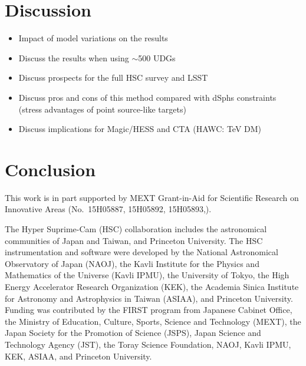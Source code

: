 \documentclass[a4paper,11pt]{article}
\begin{document}
\section{Discussion}
\begin{itemize}
    \item Impact of model variations on the results
    \item Discuss the results when using $\sim$500 UDGs
    \item Discuss prospects for the full HSC survey and LSST
    \item Discuss pros and cons of this method compared with dSphs constraints (stress advantages of point source-like targets)
    \item Discuss implications for Magic/HESS and CTA (HAWC: TeV DM) 
\end{itemize}

\section{Conclusion}

\acknowledgments
This work is in part supported by MEXT Grant-in-Aid for Scientific Research on Innovative Areas (No.~15H05887, 15H05892, 15H05893,).


The Hyper Suprime-Cam (HSC) collaboration includes the astronomical
communities of Japan and Taiwan, and Princeton University.
The HSC instrumentation and software were developed by the National
Astronomical Observatory of Japan (NAOJ), the Kavli Institute for the
Physics and Mathematics of the Universe (Kavli IPMU), the University
of Tokyo, the High Energy Accelerator Research Organization (KEK), the
Academia Sinica Institute for Astronomy and Astrophysics in Taiwan
(ASIAA), and Princeton University.  Funding was contributed by the FIRST 
program from Japanese Cabinet Office, the Ministry of Education, Culture, 
Sports, Science and Technology (MEXT), the Japan Society for the 
Promotion of Science (JSPS),  Japan Science and Technology Agency 
(JST),  the Toray Science  Foundation, NAOJ, Kavli IPMU, KEK, ASIAA,  
and Princeton University.
\end{document}
